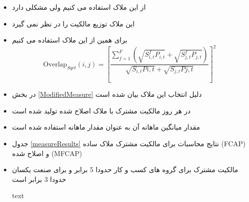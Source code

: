\documentclass[12pt, a4paper]{article}
\begin{document}
\begin{itemize}
	
	\item 
	از این ملاک استفاده می کنیم ولی مشکلی دارد
	\item 
	این ملاک توزیع مالکیت را در نظر نمی گیرد
		\item 
		برای همین از این ملاک استفاده می کنیم
		\begin{equation}
			\text{Overlap}_{Sqrt}(i, j) =  [\frac{\sum_{f =1}^{F}(\sqrt{S^f_{i,t}P_{i,t}}+\sqrt{S^f_{j,t}P_{j,t}})}{\sqrt{S_{i,t}P{i,t}} + \sqrt{S_{j,t}P{j,t}}}]^2 
			\label{sqrt0}
		\end{equation}
		\item
		در بخش 
		\ref{ModifiedMeasure}
		دلیل انتخاب این ملاک بیان شده است
\end{itemize}

\begin{LTR}

\end{LTR}




\begin{itemize}
	\item 
	در هر روز مالکیت مشترک با ملاک اصلاح شده تولید شده است
	\item 
مقدار میانگین ماهانه آن به عنوان مقدار ماهانه استفاده شده است
	\item 
جدول 
\ref{measureResults}
نتایج محاسبات برای مالکیت مشترک ملاک ساده 
(FCAP)
و اصلاح شده
(MFCAP)

\item
مالکیت مشترک برای گروه های کسب و کار حدودا 5 برابر و برای صنعت یکسان حدودا 3 برابر است
\begin{landscape}
\begin{table}[p]
	\caption{ text}
	\label{measureResults}
	\resizebox{1.5\textheight}{!}
	{
		\begin{LTR}
			\lr{}
			\end{LTR}
	}
\end{table}
\end{landscape}

\end{itemize}

  \FloatBarrier
\end{document}
